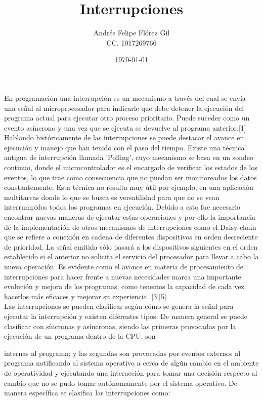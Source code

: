 \documentclass[a4paper]{article}
\title{Interrupciones}
\author{Andrés Felipe Flórez Gil \\ CC. 1017269766}
\date{\today}
\begin{document}
\maketitle

En programación una interrupción es un mecanismo a través del cual se
envía una señal al microprocesador para indicarle que debe detener la
ejecución del programa actual para ejecutar otro proceso prioritario.
Puede suceder como un evento asíncrono y una vez que se ejecuta se
devuelve al programa anterior.[1]\\
Hablando históricamente de las interrupciones se puede destacar el
avance
en ejecución y manejo que han tenido con el paso del tiempo. Existe una
técnica antigua de interrupción llamada 'Polling', cuyo mecanismo se
basa
en un sondeo continuo, donde el microcontrolador es el encargado de
verificar los estados de los eventos, lo que trae como consecuencia que
no puedan ser monitoreados los datos constantemente. Esta técnica no
resulta muy útil por ejemplo, en una aplicación multitareas donde lo que
se busca es versatilidad para que no se vean interrumpidos todos los
programas en ejecución. Debido a esto fue necesario encontrar nuevas
maneras de ejecutar estas operaciones y por ello la importancia de la
implementación de otros mecanismos de interrupciones como el Daisy-chain
que se refiere a conexión en cadena de diferentes dispositivos en orden
decreciente de prioridad. La señal emitida sólo pasará a los
dispositivos
siguientes en el orden establecido si el anterior no solicita el
servicio
del procesador para llevar a cabo la nueva operación. Es evidente como
el
avance en materia de procesamiento de interrupciones para hacer frente a
nuevas necesidades marca una importante evolución y mejora de los
programas, como tenemos la capacidad de cada vez hacerlos más eficaces y
mejorar su experiencia. [3][5] \\

Las interrupciones se pueden clasificar según cómo se genera la señal
para ejecutar la interrupción y existen diferentes tipos. De manera
general se puede clasificar con síncronas y asíncronas, siendo las
primeras provocadas por la ejecución de un programa dentro de la CPU,
son

internas al programa; y las segundas son provocadas por eventos externos
al programa notificando al sistema operativo a cerca de algún cambio en
el ambiente de operatividad y ejecutando una interacción para tomar una
decisión respecto al cambio que no se pudo tomar autónomamente por el
sistema operativo. De manera específica  se clasifica las interrupciones
como: \\
\end{document}
